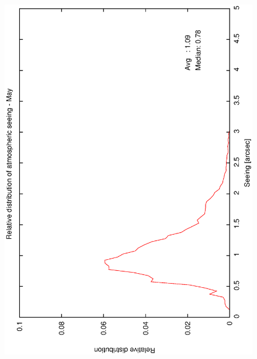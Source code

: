 {{\begin{figure}[htbp]
\begin{center}
{   \includegraphics[scale=0.25, angle=-90]{figures/ecs/corr_see_dist_may.eps}   
   \label{fig:see_dist_may}
  }
 \subfigure[] {
}
\end{center}
\end{figure}}}
